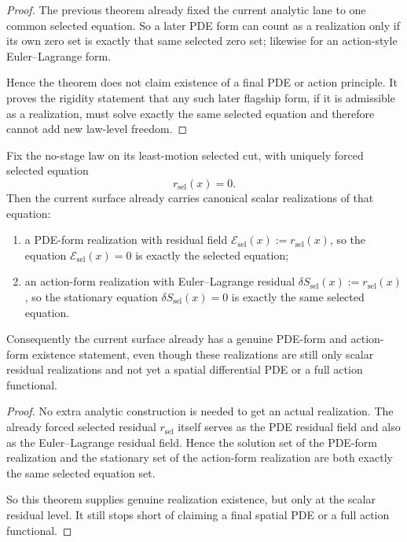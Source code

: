 \begin{proof}
The previous theorem already fixed the current analytic lane to one common
selected equation. So a later PDE form can count as a realization only if its
own zero set is exactly that same selected zero set; likewise for an
action-style Euler--Lagrange form.

Hence the theorem does not claim existence of a final PDE or action principle.
It proves the rigidity statement that any such later flagship form, if it is
admissible as a realization, must solve exactly the same selected equation and
therefore cannot add new law-level freedom.
\end{proof}

\begin{theorem}
\label{thm:canonical-scalar-pde-form-and-action-form-realizations-already-exist}
Fix the no-stage law on its least-motion selected cut, with uniquely
forced selected equation
\[
r_{\mathrm{sel}}(x)=0.
\]
Then the current surface already carries canonical scalar realizations of that
equation:
\begin{enumerate}
\item a PDE-form realization with residual field
      \(\mathcal{E}_{\mathrm{sel}}(x):=r_{\mathrm{sel}}(x)\), so the equation
      \(\mathcal{E}_{\mathrm{sel}}(x)=0\) is exactly the selected equation;
\item an action-form realization with Euler--Lagrange residual
      \(\delta S_{\mathrm{sel}}(x):=r_{\mathrm{sel}}(x)\), so the stationary
      equation \(\delta S_{\mathrm{sel}}(x)=0\) is exactly the same selected
      equation.
\end{enumerate}
Consequently the current surface already has a genuine PDE-form and
action-form existence statement, even though these realizations are still only
scalar residual realizations and not yet a spatial differential PDE or a full
action functional.
\end{theorem}

\begin{proof}
No extra analytic construction is needed to get an actual realization. The
already forced selected residual \(r_{\mathrm{sel}}\) itself serves as the PDE
residual field and also as the Euler--Lagrange residual field. Hence the
solution set of the PDE-form realization and the stationary set of the
action-form realization are both exactly the same selected equation set.

So this theorem supplies genuine realization existence, but only at the scalar
residual level. It still stops short of claiming a final spatial PDE or a full
action functional.
\end{proof}


